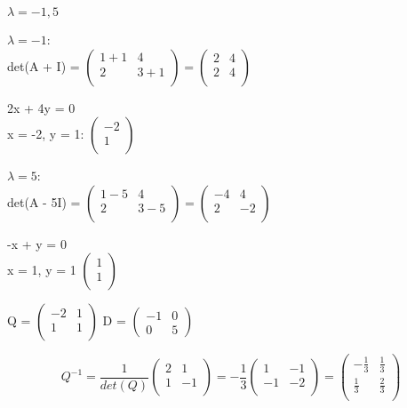 \documentclass[12pt]{article}
\begin{document}
\begin{enumerate}
    $\lambda = -1, 5$

    $\lambda = -1$: \\
    det(A + I) = $\begin{pmatrix}
        1 + 1 & 4 \\
        2 & 3 + 1 \\
    \end{pmatrix} = \begin{pmatrix}
        2 & 4 \\
        2 & 4 \\
    \end{pmatrix}$

    2x + 4y = 0 \\
    x = -2, y = 1: $\begin{pmatrix}
        -2 \\
        1 \\
    \end{pmatrix}$

    $\lambda = 5$: \\
    det(A - 5I) = $\begin{pmatrix}
        1 - 5 & 4 \\
        2 & 3 - 5 \\
    \end{pmatrix} = \begin{pmatrix}
        -4 & 4 \\
        2 & -2 \\
    \end{pmatrix}$

    -x + y = 0 \\
    x = 1, y = 1
    $\begin{pmatrix}
        1 \\
        1 \\
    \end{pmatrix}$

    Q = $\begin{pmatrix}
        -2 & 1 \\
        1 & 1\\
    \end{pmatrix}$
    D = $\begin{pmatrix}
        -1 & 0 \\
        0 & 5
    \end{pmatrix}$

\begin{equation} Q^{-1} = 
    \frac{1}{det(Q)}
    \begin{pmatrix}
        2 & 1 \\
        1 & -1\\
    \end{pmatrix} = -\frac{1}{3}\begin{pmatrix}
        1 & -1 \\
        -1 & -2\\
    \end{pmatrix} = \begin{pmatrix}
        -\frac{1}{3} & \frac{1}{3} \\
        \frac{1}{3} & \frac{2}{3}\\
    \end{pmatrix}
\end{equation}


\end{enumerate}
\end{document}
